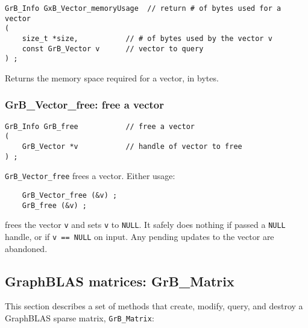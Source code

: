 \documentclass[12pt]{article}
\begin{document}
\begin{mdframed}[userdefinedwidth=6in]
{\footnotesize
\begin{verbatim}
GrB_Info GxB_Vector_memoryUsage  // return # of bytes used for a vector
(
    size_t *size,           // # of bytes used by the vector v
    const GrB_Vector v      // vector to query
) ;
\end{verbatim} } \end{mdframed}

Returns the memory space required for a vector, in bytes.

\subsubsection{{\sf GrB\_Vector\_free:}          free a vector}
\label{vector_free}

\begin{mdframed}[userdefinedwidth=6in]
{\footnotesize
\begin{verbatim}
GrB_Info GrB_free           // free a vector
(
    GrB_Vector *v           // handle of vector to free
) ;
\end{verbatim}
} \end{mdframed}

\verb'GrB_Vector_free' frees a vector.  Either usage:

    {\small
    \begin{verbatim}
    GrB_Vector_free (&v) ;
    GrB_free (&v) ; \end{verbatim}}

\noindent
frees the vector \verb'v' and sets \verb'v' to \verb'NULL'.  It safely does
nothing if passed a \verb'NULL' handle, or if \verb'v == NULL' on input.  Any
pending updates to the vector are abandoned.

\newpage
\subsection{GraphBLAS matrices: {\sf GrB\_Matrix}} %
\label{matrix}

This section describes a set of methods that create, modify, query,
and destroy a GraphBLAS sparse matrix, \verb'GrB_Matrix':
\end{document}
